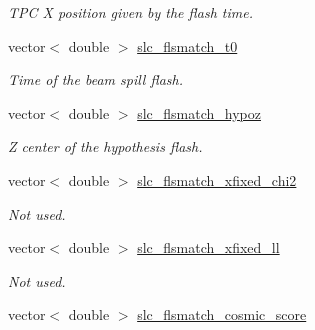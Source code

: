 \begin{DoxyCompactItemize}
\begin{DoxyCompactList}\small\item\em T\-P\-C X position given by the flash time. \end{DoxyCompactList}\item 
\hypertarget{classUBXSecEvent_af4f355424e0a80580b581268eb25dd12}{vector$<$ double $>$ \hyperlink{classUBXSecEvent_af4f355424e0a80580b581268eb25dd12}{slc\-\_\-flsmatch\-\_\-t0}}\label{classUBXSecEvent_af4f355424e0a80580b581268eb25dd12}

\begin{DoxyCompactList}\small\item\em Time of the beam spill flash. \end{DoxyCompactList}\item 
\hypertarget{classUBXSecEvent_a237e3f0d9a59f740ee1725fd7d8186bd}{vector$<$ double $>$ \hyperlink{classUBXSecEvent_a237e3f0d9a59f740ee1725fd7d8186bd}{slc\-\_\-flsmatch\-\_\-hypoz}}\label{classUBXSecEvent_a237e3f0d9a59f740ee1725fd7d8186bd}

\begin{DoxyCompactList}\small\item\em Z center of the hypothesis flash. \end{DoxyCompactList}\item 
\hypertarget{classUBXSecEvent_a51b8f4fca1456ceba66f171ac8e9eb4a}{vector$<$ double $>$ \hyperlink{classUBXSecEvent_a51b8f4fca1456ceba66f171ac8e9eb4a}{slc\-\_\-flsmatch\-\_\-xfixed\-\_\-chi2}}\label{classUBXSecEvent_a51b8f4fca1456ceba66f171ac8e9eb4a}

\begin{DoxyCompactList}\small\item\em Not used. \end{DoxyCompactList}\item 
\hypertarget{classUBXSecEvent_a1bf76c945234f61391ad4d287862f2a8}{vector$<$ double $>$ \hyperlink{classUBXSecEvent_a1bf76c945234f61391ad4d287862f2a8}{slc\-\_\-flsmatch\-\_\-xfixed\-\_\-ll}}\label{classUBXSecEvent_a1bf76c945234f61391ad4d287862f2a8}

\begin{DoxyCompactList}\small\item\em Not used. \end{DoxyCompactList}\item 
\hypertarget{classUBXSecEvent_ad74c03fcc0b57d4084eb05d0f5617b3a}{vector$<$ double $>$ \hyperlink{classUBXSecEvent_ad74c03fcc0b57d4084eb05d0f5617b3a}{slc\-\_\-flsmatch\-\_\-cosmic\-\_\-score}}\label{classUBXSecEvent_ad74c03fcc0b57d4084eb05d0f5617b3a}


\end{DoxyCompactItemize}
